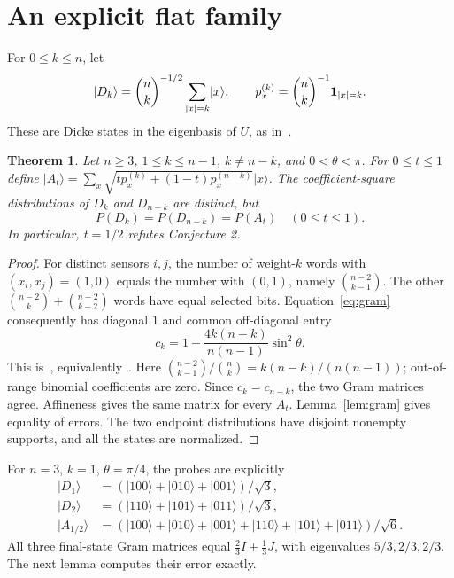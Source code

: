 \documentclass[11pt]{article}
\newtheorem{theorem}{Theorem}
\newcommand{\ket}[1]{\lvert #1\rangle}
\begin{document}
\section{An explicit flat family}
For $0\leq k\leq n$, let
\[
 \ket{D_k}=\binom nk^{-1/2}\sum_{|x|=k}\ket x,
 \qquad p^{(k)}_x=\binom nk^{-1}{\bf1}_{|x|=k}.
\]
These are Dicke states in the eigenbasis of $U$, as in~\cite{ZGH}.

\begin{theorem}\label{thm:flat}
Let $n\geq3$, $1\leq k\leq n-1$, $k\ne n-k$, and $0<\theta<\pi$.
For $0\leq t\leq1$ define
$\ket{A_t}=\sum_x\sqrt{t p^{(k)}_x+(1-t)p^{(n-k)}_x}\ket x$.
The coefficient-square distributions of $D_k$ and $D_{n-k}$ are distinct,
but
\[
 P(D_k)=P(D_{n-k})=P(A_t)\quad(0\leq t\leq1).
\]
In particular, $t=1/2$ refutes Conjecture 2.
\end{theorem}
\begin{proof}
For distinct sensors $i,j$, the number of weight-$k$ words with
$(x_i,x_j)=(1,0)$ equals the number with $(0,1)$, namely
$\binom{n-2}{k-1}$. The other
$\binom{n-2}{k}+\binom{n-2}{k-2}$ words have equal selected bits.
Equation~\eqref{eq:gram} consequently has diagonal $1$ and common
off-diagonal entry
\begin{equation}\label{eq:ck}
 c_k=1-\frac{4k(n-k)}{n(n-1)}\sin^2\theta.
\end{equation}
This is~\cite[Eq.~(8)]{SHCM18}, equivalently~\cite[Eq.~(14)]{SLHCM24}.
Here $\binom{n-2}{k-1}/\binom nk=k(n-k)/(n(n-1))$;
out-of-range binomial coefficients are zero.
Since $c_k=c_{n-k}$, the two Gram matrices agree. Affineness gives
the same matrix for every $A_t$. Lemma~\ref{lem:gram} gives equality of
errors. The two endpoint distributions have disjoint nonempty supports,
and all the states are normalized.
\end{proof}

For $n=3$, $k=1$, $\theta=\pi/4$, the probes are explicitly
\begin{align*}
 \ket{D_1}&=(\ket{100}+\ket{010}+\ket{001})/\sqrt3,\\
 \ket{D_2}&=(\ket{110}+\ket{101}+\ket{011})/\sqrt3,\\
 \ket{A_{1/2}}&=(\ket{100}+\ket{010}+\ket{001}
                  +\ket{110}+\ket{101}+\ket{011})/\sqrt6.
\end{align*}
All three final-state Gram matrices equal
$\frac23 I+\frac13J$, with eigenvalues $5/3,2/3,2/3$.
The next lemma computes their error exactly.
\end{document}
